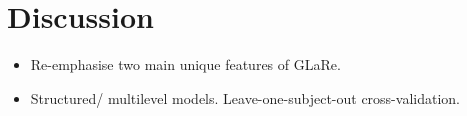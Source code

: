 \section{Discussion}\label{sec:discussion}

\begin{itemize}
    \item Re-emphasise two main unique features of GLaRe.
    \item Structured/ multilevel models. Leave-one-subject-out cross-validation.
\end{itemize}
